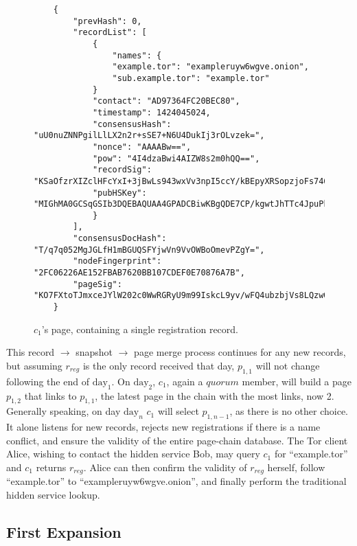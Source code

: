\begin{figure}
	\begin{lstlisting}
	{
		"prevHash": 0,
		"recordList": [
			{
				"names": {
				"example.tor": "exampleruyw6wgve.onion",
				"sub.example.tor": "example.tor"
			}
			"contact": "AD97364FC20BEC80",
			"timestamp": 1424045024,
			"consensusHash": "uU0nuZNNPgilLlLX2n2r+sSE7+N6U4DukIj3rOLvzek=",
			"nonce": "AAAABw==",
			"pow": "4I4dzaBwi4AIZW8s2m0hQQ==",
			"recordSig": 	"KSaOfzrXIZclHFcYxI+3jBwLs943wxVv3npI5ccY/kBEpyXRSopzjoFs746n0tJqUpdY4Kbe6DBwERaN7ELmSSK9Pu6q8QeKzNAh+QOnKl0fKBN7fqowjkQ3ktFkR0Vuox9WrrbNTMa4+up0Np52hlbKA3zSRz4fbR9NVlh6uuQ=",
			"pubHSKey": "MIGhMA0GCSqGSIb3DQEBAQUAA4GPADCBiwKBgQDE7CP/kgwtJhTTc4JpuPkvA7Ln9wgc+fgTKgkyUp1zusxgUAn1c1MGx4YhO42KPB7dyZOf3pcRk94XsYFY1ULkF2+tf9KdNe7GFzJyMFCQENnUcVXbcwLH4vAeiGK7R/nScbCbyc9LT+VE1fbKchTL1QzLVBLqJTxhR+9YPi8x+QIFAdZ8BJs="
			}
		],
		"consensusDocHash": "T/q7q052MgJGLfH1mBGUQSFYjwVn9VvOWBoOmevPZgY=",
		"nodeFingerprint": "2FC06226AE152FBAB7620BB107CDEF0E70876A7B",
		"pageSig": "KO7FXtoTJmxceJYlW202c0WwRGRyU9m99IskcL9yv/wFQ4ubzbjVs8LQzwQub9kDJ8Htpc9rRZvneRRbusFv1nvaeJw+WgRt+Tck0uapndHKYaQcK3XTIFYdmT1lLm7QxSKjnIxgBkwKT0QWdGLUhuRgGe5CXmqrPeDfU/gsgLs="
	}
	\end{lstlisting}
	\caption{$ c_{1} $'s page, containing a single registration record.}
	\label{fig:c1page}
\end{figure}

This record $ \to $ snapshot $ \to $ page merge process continues for any new records, but assuming $ r_{reg} $ is the only record received that day, $ p_{1,1} $ will not change following the end of $ \textrm{day}_{1} $. On $ \textrm{day}_{2} $, $ c_{1} $, again a $ quorum $ member, will build a page $ p_{1,2} $ that links to $ p_{1,1} $, the latest page in the chain with the most links, now 2. Generally speaking, on day $ \textrm{day}_{n} $ $ c_{1} $ will select $ p_{1,n-1} $, as there is no other choice. It alone listens for new records, rejects new registrations if there is a name conflict, and ensure the validity of the entire page-chain database. The Tor client Alice, wishing to contact the hidden service Bob, may query $ c_{1} $ for ``example.tor'' and $ c_{1} $ returns $ r_{reg} $. Alice can then confirm the validity of $ r_{reg} $ herself, follow ``example.tor'' to ``exampleruyw6wgve.onion'', and finally perform the traditional hidden service lookup.

\subsection{First Expansion}

